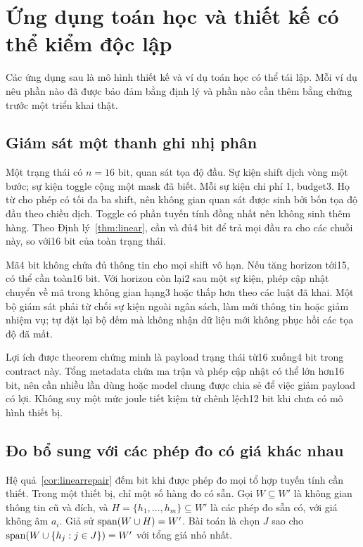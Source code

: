 \section{Ứng dụng toán học và thiết kế có thể kiểm độc lập}\label{sec:applications}
Các ứng dụng sau là mô hình thiết kế và ví dụ toán học có thể tái lập. Mỗi ví dụ nêu phần nào đã được bảo đảm bằng định lý và phần nào cần thêm bằng chứng trước một triển khai thật.

\subsection{Giám sát một thanh ghi nhị phân}
Một trạng thái có $n=16$ bit, quan sát tọa độ đầu. Sự kiện shift dịch vòng một bước; sự kiện toggle cộng một mask đã biết. Mỗi sự kiện chi phí 1, budget3. Họ từ cho phép có tối đa ba shift, nên không gian quan sát được sinh bởi bốn tọa độ đầu theo chiều dịch. Toggle có phần tuyến tính đồng nhất nên không sinh thêm hàng. Theo Định lý~\ref{thm:linear}, cần và đủ4 bit để trả mọi đầu ra cho các chuỗi này, so với16 bit của toàn trạng thái.

Mã4 bit không chứa đủ thông tin cho mọi shift vô hạn. Nếu tăng horizon tới15, có thể cần toàn16 bit. Với horizon còn lại2 sau một sự kiện, phép cập nhật chuyển về mã trong không gian hạng3 hoặc thấp hơn theo các luật đã khai. Một bộ giám sát phải từ chối sự kiện ngoài ngân sách, làm mới thông tin hoặc giảm nhiệm vụ; tự đặt lại bộ đếm mà không nhận dữ liệu mới không phục hồi các tọa độ đã mất.

Lợi ích được theorem chứng minh là payload trạng thái từ16 xuống4 bit trong contract này. Tổng metadata chứa ma trận và phép cập nhật có thể lớn hơn16 bit, nên cần nhiều lần dùng hoặc model chung được chia sẻ để việc giảm payload có lợi. Không suy một mức joule tiết kiệm từ chênh lệch12 bit khi chưa có mô hình thiết bị.

\subsection{Đo bổ sung với các phép đo có giá khác nhau}
Hệ quả~\ref{cor:linearrepair} đếm bit khi được phép đo mọi tổ hợp tuyến tính cần thiết. Trong một thiết bị, chỉ một số hàng đo có sẵn. Gọi $W\subseteq W'$ là không gian thông tin cũ và đích, và $H=\{h_1,\ldots,h_m\}\subseteq W'$ là các phép đo sẵn có, với giá không âm $a_i$. Giả sử $\operatorname{span}(W\cup H)=W'$. Bài toán là chọn $J$ sao cho $\operatorname{span}(W\cup\{h_j:j\in J\})=W'$ với tổng giá nhỏ nhất.

